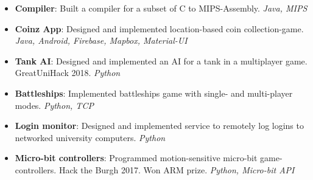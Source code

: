 \documentclass[11pt,a4paper]{article}
\begin{document}
\begin{itemize}
    \item \textbf{Compiler}:
        Built a compiler for a subset of C to MIPS-Assembly.
        \textit{Java, MIPS}
    \item \textbf{Coinz App}:
        Designed and implemented location-based coin collection-game.
		\textit{Java, Android, Firebase, Mapbox, Material-UI}
    \item \textbf{Tank AI}:
        Designed and implemented an AI for a tank in a multiplayer game. GreatUniHack 2018.
        \textit{Python}
    \item \textbf{Battleships}:
        Implemented battleships game with single- and multi-player modes.
        \textit{Python, TCP}
    \item \textbf{Login monitor}:
        Designed and implemented service to remotely log logins to networked university computers.
        \textit{Python}
    \item \textbf{Micro-bit controllers}:
        Programmed motion-sensitive micro-bit game-controllers. Hack the Burgh 2017.
        Won ARM prize.
        \textit{Python, Micro-bit API}
\end{itemize}


\midrule
\end{document}
